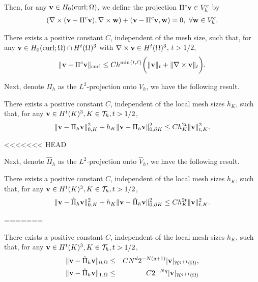 \documentclass[final,leqno]{siamltex704}
\newcommand{\bv}{{\bf v}}
\def\bv{{\bf v}}
\def\bw{{\bf w}}
\begin{document}
Then, for any $\bv\in H_0(\text{curl};\Omega)$, we define the projection $\Pi^c\bv\in V_h^c$ by
\begin{eqnarray}
(\nabla\times(\bv-\Pi^c\bv),\nabla\times\bw)+(\bv-\Pi^c\bv,\bw)=0,\ \forall\bw\in V_h^c.
\end{eqnarray}

\begin{lemma}
There exists a positive constant $C$, independent of the mesh size, such that, for any $\bv\in H_0(\text{curl};\Omega)\cap H^t(\Omega)^3$ with $\nabla\times\bv\in H^t(\Omega)^3$, $t>1/2$,
\begin{eqnarray}
\|\bv-\Pi^c\bv\|_\text{curl}\le Ch^{\min\{t,\ell\}}\bigg(\|\bv\|_t+\|\nabla\times\bv\|_t\bigg).
\end{eqnarray}
\end{lemma}

Next, denote $\Pi_h$ as the $L^2$-projection onto $V_h$, we have the following result.
\begin{lemma}
There exists a positive constant $C$, independent of the local mesh sizes $h_K$, such that, for any $\bv\in H^t(K)^3, K\in\mathcal{T}_h, t>1/2$,
\begin{eqnarray}
\|\bv-\Pi_h\bv\|_{0,K}^2+h_K\|\bv-\Pi_h\bv\|_{0,\partial K}^2\le Ch_K^{2t}\|\bv\|_{t,K}^2.
\end{eqnarray}
\end{lemma}

<<<<<<< HEAD
{\color{red}
Next, denote $\hat{\Pi}_h$ as the $L^2$-projection onto $\hat{V}_h$, we have the following result.
\begin{lemma}
There exists a positive constant $C$, independent of the local mesh sizes $h_K$, such that, for any $\bv\in H^t(K)^3, K\in\mathcal{T}_h, t>1/2$,
\begin{eqnarray}
\|\bv-\hat{\Pi}_h\bv\|_{0,K}^2+h_K\|\bv-\hat{\Pi}_h\bv\|_{0,\partial K}^2\le Ch_K^{2t}\|\bv\|_{t,K}^2.
\end{eqnarray}
\end{lemma}
}
=======
\begin{lemma}
There exists a positive constant $C$, independent of the local mesh sizes $h_K$, such that, for any $\bv\in H^t(K)^3, K\in\mathcal{T}_h, t>1/2$,
\begin{eqnarray}
\|\bv-\hat{\Pi}_h\bv\|_{0,\Omega}&\le& CN^d2^{-N(q+1)}|\bv|_{\mathcal{H}^{q+1}(\Omega)},\\
\|\bv-\hat{\Pi}_h\bv\|_{1,\Omega}&\le& C2^{-Nq}|\bv|_{\mathcal{H}^{q+1}(\Omega)}
\end{eqnarray}
\end{lemma}
\end{document}
